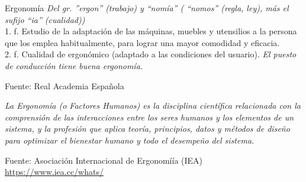 
\begin{frame}

      \begin{block}{Ergonom\'ia}
        \emph{Del gr. 
''ergon'' (trabajo) y 
``nom\'ia'' (  ``nomos'' (regla, ley), 
	m\'as el sufijo ``ia'' (cualidad))}\\
1. f. Estudio de la adaptaci\'on de las m\'aquinas, muebles y utensilios a la persona que los emplea habitualmente, para lograr una mayor comodidad y eficacia.\\
2. f. Cualidad de ergon\'omico (adaptado a las condiciones del usuario). \emph{El puesto de conducci\'on tiene buena ergonom\'ia.}

{\tiny Fuente: Real Academia Espa\~nola }

\vspace{3mm}

\emph{La Ergonom\'ia (o Factores Humanos) es la disciplina cient\'ifica relacionada con la comprensi\'on de las interacciones entre los seres humanos y los elementos de un sistema, y la profesi\'on que aplica teor\'ia, principios, datos y m\'etodos de dise\~no para optimizar el bienestar humano y todo el desempe\~no del sistema.
}

{\tiny Fuente: Asociaci\'on Internacional de Ergonom\'iía (IEA) \,
\url{https://www.iea.cc/whats/}}
      \end{block}

\end{frame}

